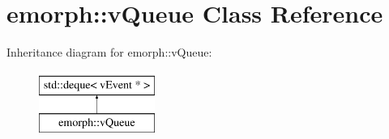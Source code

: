 \hypertarget{classemorph_1_1vQueue}{\section{emorph\-:\-:v\-Queue Class Reference}
\label{classemorph_1_1vQueue}
}
Inheritance diagram for emorph\-:\-:v\-Queue\-:\begin{figure}[H]
\begin{center}
\leavevmode
\includegraphics[height=2.000000cm]{classemorph_1_1vQueue}
\end{center}
\end{figure}
